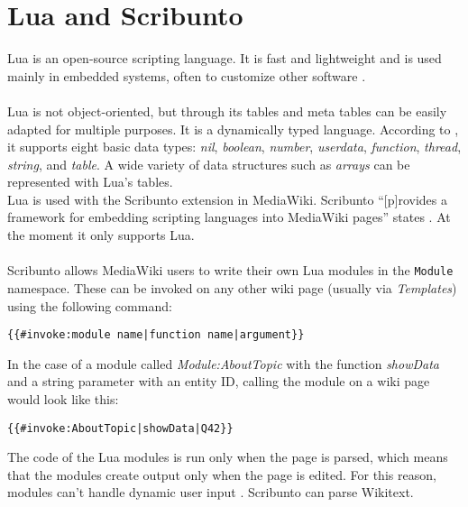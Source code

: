 \section{Lua and Scribunto}

Lua is an open-source scripting language. It is fast and lightweight and is used mainly in embedded systems, often to customize other software \citep{lua:01}. \\
\\
Lua is not object-oriented, but through its tables and meta tables can be easily adapted for multiple purposes. It is a dynamically typed language. According to \citet[9]{luabook:01}, it supports eight basic data types: \textit{nil}, \textit{boolean}, \textit{number}, \textit{userdata}, \textit{function}, \textit{thread}, \textit{string}, and \textit{table}. A wide variety of data structures such as \textit{arrays} can be represented with Lua's tables. \\
Lua is used with the Scribunto extension in MediaWiki. Scribunto ``[p]rovides a framework for embedding scripting languages into MediaWiki pages'' states \citet{wiki:19}. At the moment it only supports Lua. \\
\\
Scribunto allows MediaWiki users to write their own Lua modules in the \texttt{\justify Module} namespace. These can be invoked on any other wiki page (usually via \textit{Templates}) using the following command:
\begin{lstlisting}[frame=single] 
{{#invoke:module name|function name|argument}}
\end{lstlisting}

In the case of a module called \textit{Module:AboutTopic} with the function \textit{showData} and a string parameter with an entity ID, calling the module on a wiki page would look like this:
\begin{lstlisting}[frame=single] 
{{#invoke:AboutTopic|showData|Q42}}
\end{lstlisting}

The code of the Lua modules is run only when the page is parsed, which means that the modules create output only when the page is edited. For this reason, modules can't handle dynamic user input \citep{wiki:20}. Scribunto can parse Wikitext.
